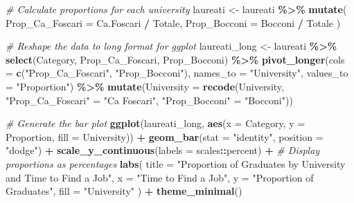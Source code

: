 \documentclass[
]{article}
\newenvironment{Shaded}{\begin{snugshade}}{\end{snugshade}}
\newcommand{\AttributeTok}[1]{\textcolor[rgb]{0.13,0.29,0.53}{#1}}
\newcommand{\CommentTok}[1]{\textcolor[rgb]{0.56,0.35,0.01}{\textit{#1}}}
\newcommand{\FunctionTok}[1]{\textcolor[rgb]{0.13,0.29,0.53}{\textbf{#1}}}
\newcommand{\NormalTok}[1]{#1}
\newcommand{\OtherTok}[1]{\textcolor[rgb]{0.56,0.35,0.01}{#1}}
\newcommand{\SpecialCharTok}[1]{\textcolor[rgb]{0.81,0.36,0.00}{\textbf{#1}}}
\newcommand{\StringTok}[1]{\textcolor[rgb]{0.31,0.60,0.02}{#1}}
\begin{document}
\begin{Shaded}
\begin{Highlighting}[]
\CommentTok{\# Calculate proportions for each university}
\NormalTok{laureati }\OtherTok{\textless{}{-}}\NormalTok{ laureati }\SpecialCharTok{\%\textgreater{}\%}
  \FunctionTok{mutate}\NormalTok{(}
    \AttributeTok{Prop\_Ca\_Foscari =}\NormalTok{ Ca.Foscari }\SpecialCharTok{/}\NormalTok{ Totale,}
    \AttributeTok{Prop\_Bocconi =}\NormalTok{ Bocconi }\SpecialCharTok{/}\NormalTok{ Totale}
\NormalTok{  )}

\CommentTok{\# Reshape the data to long format for ggplot}
\NormalTok{laureati\_long }\OtherTok{\textless{}{-}}\NormalTok{ laureati }\SpecialCharTok{\%\textgreater{}\%}
  \FunctionTok{select}\NormalTok{(Category, Prop\_Ca\_Foscari, Prop\_Bocconi) }\SpecialCharTok{\%\textgreater{}\%}
  \FunctionTok{pivot\_longer}\NormalTok{(}\AttributeTok{cols =} \FunctionTok{c}\NormalTok{(}\StringTok{"Prop\_Ca\_Foscari"}\NormalTok{, }\StringTok{"Prop\_Bocconi"}\NormalTok{), }
               \AttributeTok{names\_to =} \StringTok{"University"}\NormalTok{, }
               \AttributeTok{values\_to =} \StringTok{"Proportion"}\NormalTok{) }\SpecialCharTok{\%\textgreater{}\%}
  \FunctionTok{mutate}\NormalTok{(}\AttributeTok{University =} \FunctionTok{recode}\NormalTok{(University, }
                             \StringTok{"Prop\_Ca\_Foscari"} \OtherTok{=} \StringTok{"Ca\textquotesingle{} Foscari"}\NormalTok{, }
                             \StringTok{"Prop\_Bocconi"} \OtherTok{=} \StringTok{"Bocconi"}\NormalTok{))}

\CommentTok{\# Generate the bar plot}
\FunctionTok{ggplot}\NormalTok{(laureati\_long, }\FunctionTok{aes}\NormalTok{(}\AttributeTok{x =}\NormalTok{ Category, }\AttributeTok{y =}\NormalTok{ Proportion, }\AttributeTok{fill =}\NormalTok{ University)) }\SpecialCharTok{+}
  \FunctionTok{geom\_bar}\NormalTok{(}\AttributeTok{stat =} \StringTok{"identity"}\NormalTok{, }\AttributeTok{position =} \StringTok{"dodge"}\NormalTok{) }\SpecialCharTok{+}
  \FunctionTok{scale\_y\_continuous}\NormalTok{(}\AttributeTok{labels =}\NormalTok{ scales}\SpecialCharTok{::}\NormalTok{percent) }\SpecialCharTok{+} \CommentTok{\# Display proportions as percentages}
  \FunctionTok{labs}\NormalTok{(}
    \AttributeTok{title =} \StringTok{"Proportion of Graduates by University and Time to Find a Job"}\NormalTok{,}
    \AttributeTok{x =} \StringTok{"Time to Find a Job"}\NormalTok{,}
    \AttributeTok{y =} \StringTok{"Proportion of Graduates"}\NormalTok{,}
    \AttributeTok{fill =} \StringTok{"University"}
\NormalTok{  ) }\SpecialCharTok{+}
  \FunctionTok{theme\_minimal}\NormalTok{()}
\end{Highlighting}
\end{Shaded}
\end{document}
